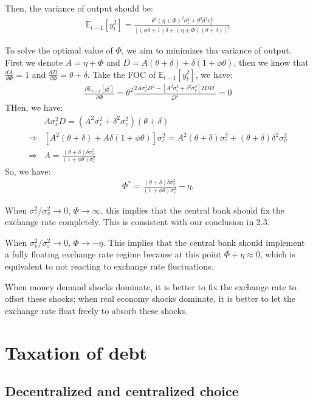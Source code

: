 \documentclass[a4paper,12pt]{article} %
\theoremstyle{nonitalic}
\begin{document}
Then, the variance of output should be:
\begin{gather*}
    \mathbb{E}_{t-1} [y_t^2] = \frac{\theta^2 (\eta + \Phi)^2 \sigma_{\varepsilon}^2 + \theta^2 \delta^2 v_t^2}{\left[ (\phi \theta + 1)\delta + (\eta + \Phi) (\theta + \delta) \right]^2}
\end{gather*}

To solve the optimal value of $\Phi$, we aim to minimizes tha variance of output.
First we denote $A = \eta + \Phi$ and $D = A(\theta +\delta) + \delta (1 + \phi \theta)$,
then we know that $\frac{d A}{d \Phi} = 1$ and $\frac{d D}{d \Phi} = \theta + \delta$.
Take the FOC of $\mathbb{E}_{t-1}[y_t^2]$, we have:
\begin{gather*}
    \frac{\partial \mathbb{E}_{t-1}[y_t^2]}{\partial \Phi} = \theta^2 \frac{2A \sigma_{\varepsilon}^2 D^2 - \left[A^2 \sigma_{\varepsilon}^2 + \delta^2 \sigma_v^2\right] 2D D^{\prime}}{D^4}  = 0
\end{gather*}
THen, we have:
\begin{align*}
    & A \sigma_{\varepsilon}^2 D = \left( A^2 \sigma_{\varepsilon}^2 + \delta^2 \sigma_v^2 \right)(\theta + \delta) \\
    \Rightarrow & \left[ A^2(\theta + \delta) + A \delta (1 + \phi \theta) \right] \sigma_{\varepsilon}^2 = A^2 (\theta + \delta) \sigma_{\varepsilon}^2 + (\theta + \delta) \delta ^2 \sigma _v^2 \\
    \Rightarrow & A = \frac{(\theta + \delta) \delta \sigma_v^2}{(1 + \phi \theta) \sigma_{\varepsilon}^2}
\end{align*}
So, we have:
\begin{gather*}
    \Phi^* = \frac{(\theta + \delta) \delta \sigma_v^2}{(1 + \phi \theta) \sigma_{\varepsilon}^2} - \eta.
\end{gather*}

When $\sigma_\varepsilon^2/\sigma_v^2 \to 0$, $\Phi \to \infty$, 
this implies that the central bank should fix the exchange rate completely. 
This is consistent with our conclusion in 2.3.

When $\sigma_v^2/\sigma_\varepsilon^2 \to 0$, $\Phi \to -\eta$. 
This implies that the central bank should implement a fully floating exchange rate regime 
because at this point $\Phi + \eta \approx 0$, which is equivalent to not reacting to exchange rate fluctuations.

When money demand shocks dominate, 
it is better to fix the exchange rate to offset these shocks; 
when real economy shocks dominate, it is better to let the exchange rate float freely to absorb these shocks.


\section{Taxation of debt}

\subsection{Decentralized and centralized choice}
\end{document}
